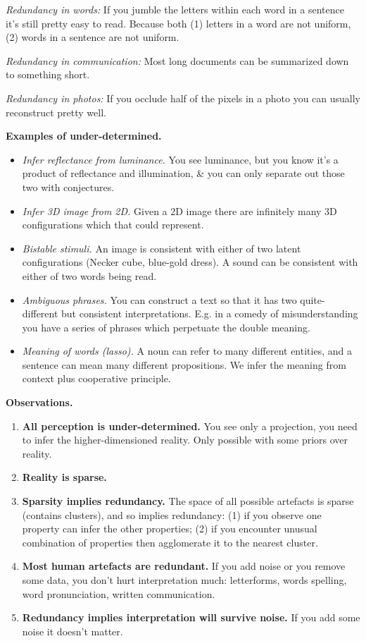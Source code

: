 \documentclass[
  11pt,
  letterpaper,
  DIV=11,
  numbers=noendperiod,
  oneside]{scrartcl}
\begin{document}
\emph{Redundancy in words:} If you jumble the letters within each word
in a sentence it's still pretty easy to read. Because both (1) letters
in a word are not uniform, (2) words in a sentence are not uniform.

\emph{Redundancy in communication:} Most long documents can be
summarized down to something short.

\emph{Redundancy in photos:} If you occlude half of the pixels in a
photo you can usually reconstruct pretty well.

\textbf{Examples of under-determined.}

\begin{itemize}
\item
  \emph{Infer reflectance from luminance.} You see luminance, but you
  know it's a product of reflectance and illumination, \& you can only
  separate out those two with conjectures.
\item
  \emph{Infer 3D image from 2D.} Given a 2D image there are infinitely
  many 3D configurations which that could represent.
\item
  \emph{Bistable stimuli.} An image is consistent with either of two
  latent configurations (Necker cube, blue-gold dress). A sound can be
  consistent with either of two words being read.
\item
  \emph{Ambiguous phrases.} You can construct a text so that it has two
  quite-different but consistent interpretations. E.g. in a comedy of
  misunderstanding you have a series of phrases which perpetuate the
  double meaning.
\item
  \emph{Meaning of words (lasso).} A noun can refer to many different
  entities, and a sentence can mean many different propositions. We
  infer the meaning from context plus cooperative principle.
\end{itemize}

\textbf{Observations.}

\begin{enumerate}
\def\labelenumi{\arabic{enumi}.}
\item
  \textbf{All perception is under-determined.} You see only a
  projection, you need to infer the higher-dimensioned reality. Only
  possible with some priors over reality.
\item
  \textbf{Reality is sparse.}
\item
  \textbf{Sparsity implies redundancy.} The space of all possible
  artefacts is sparse (contains clusters), and so implies redundancy:
  (1) if you observe one property can infer the other properties; (2) if
  you encounter unusual combination of properties then agglomerate it to
  the nearest cluster.
\item
  \textbf{Most human artefacts are redundant.} If you add noise or you
  remove some data, you don't hurt interpretation much: letterforms,
  words spelling, word pronunciation, written communication.
\item
  \textbf{Redundancy implies interpretation will survive noise.} If you
  add some noise it doesn't matter.
\end{enumerate}
\end{document}
